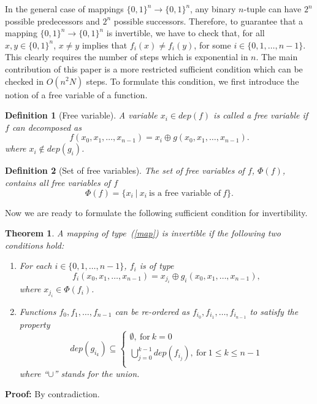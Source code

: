 \documentclass[9pt,conference]{IEEEtran} \usepackage{times}
\newtheorem{definition}{Definition}
\newtheorem{theorem}{Theorem}
\begin{document}
In the general case of mappings $\{0,1\}^n \rightarrow \{0,1\}^n$,
any binary $n$-tuple can have $2^n$ possible predecessors 
and $2^n$ possible successors. Therefore, to guarantee that 
a mapping $\{0,1\}^n \rightarrow \{0,1\}^n$ is 
invertible, we have to check that, for all $x, y \in \{0,1\}^n$, $x \not= y$ implies that $f_i(x) \not= f_i(y)$,
for some
$i \in \{0,1,\ldots,n-1\}$. This clearly requires 
the number of steps which is exponential in $n$.
The main contribution of this paper is a
more restricted sufficient condition
which can be checked in $O(n^2 N)$ steps.
To formulate this condition, we first introduce the  notion of a free variable of a function.

\begin{definition}[Free variable]
A variable $x_i \in dep(f)$ is called a free variable if
$f$ can decomposed as
\[
f(x_0,x_1,\ldots,x_{n-1}) = x_i \oplus g(x_0,x_1,\ldots,x_{n-1}).
\]
where $x_i \not\in dep(g_i)$.

\end{definition}

\begin{definition}[Set of free variables]
The set of free variables of $f$, $\Phi(f)$, contains all free variables of $f$
\[
\Phi(f) = \{x_i ~|~ x_i ~\mbox{is a free variable of}~ f\}.
\]
\end{definition}

Now we are ready to formulate the following sufficient condition for invertibility.

\begin{theorem} \label{t2}
A mapping of type~(\ref{map}) is invertible if the following two conditions hold:
\begin{enumerate}
\item For each $i \in \{0,1,\ldots,n-1\}$, $f_i$ is of type
\begin{equation} \label{th_main}
f_i(x_0,x_1,\ldots,x_{n-1}) = x_{j_i} \oplus g_i(x_0,x_1,\ldots,x_{n-1}),
\end{equation}
where $x_{j_i} \in \Phi(f_i)$.
\item Functions $f_{0}, f_{1}, \ldots, f_{n-1}$ can be re-ordered as $f_{i_0}, f_{i_1}, \ldots, f_{i_{n-1}}$ to satisfy the property
\[
dep(g_{i_k})  \subseteq  \left\{
\begin{array}{l}
 \emptyset, ~ \mbox{for} ~ k = 0\\
 \displaystyle\bigcup_{j=0}^{k-1} dep(f_{i_j}), ~ \mbox{for} ~ 1 \leq k \leq n-1 \\
\end{array}
\right.
\]
where ``$\cup$'' stands for the union.
\end{enumerate}
\end{theorem}
{\bf Proof:} By contradiction. 
\end{document}
